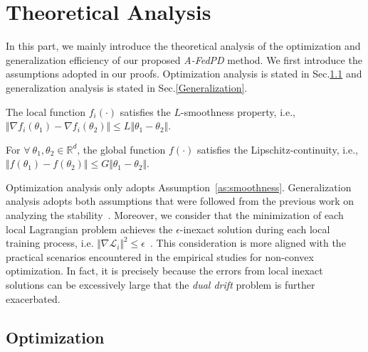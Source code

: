 \section{Theoretical Analysis}
\label{theoretical analysis}
In this part, we mainly introduce the theoretical analysis of the optimization and generalization efficiency of our proposed \textit{A-FedPD} method. We first introduce the assumptions adopted in our proofs. Optimization analysis is stated in Sec.\ref{Optimization} and generalization analysis is stated in Sec.\ref{Generalization}.

\begin{assumption}[Smoothness]
\label{as:smoothness}
    The local function $f_i(\cdot)$ satisfies the $L$-smoothness property, i.e., $\Vert\nabla f_i(\theta_1) - \nabla f_i(\theta_2)\Vert\leq L\Vert \theta_1 - \theta_2\Vert$.
\end{assumption}

\begin{assumption}
\label{as:lipschitz}
    For $\forall \ \theta_1, \theta_2 \in \mathbb{R}^d$, the global function $f(\cdot)$ satisfies the Lipschitz-continuity, i.e., $\Vert f(\theta_1) - f(\theta_2)\Vert\leq G\Vert \theta_1 - \theta_2\Vert$.
\end{assumption}

Optimization analysis only adopts Assumption~\ref{as:smoothness}. Generalization analysis adopts both assumptions that were followed from the previous work on analyzing the stability~\citep{hardt2016train,lei2020fine,zhou2021towards,sun2023understanding,sun2023mode,sun2023efficient}. Moreover, we consider that the minimization of each local Lagrangian problem achieves the $\epsilon$-inexact solution during each local training process, i.e. $\Vert \nabla \mathcal{L}_i \Vert^2 \leq \epsilon$~\citep{zhang2021fedpd,li2023dfedadmm,gong2022fedadmm,wang2022fedadmm}. This consideration is more aligned with the practical scenarios encountered in the empirical studies for non-convex optimization. In fact, it is precisely because the errors from local inexact solutions can be excessively large that the \textit{dual drift} problem is further exacerbated.

\subsection{Optimization}
\label{Optimization}

